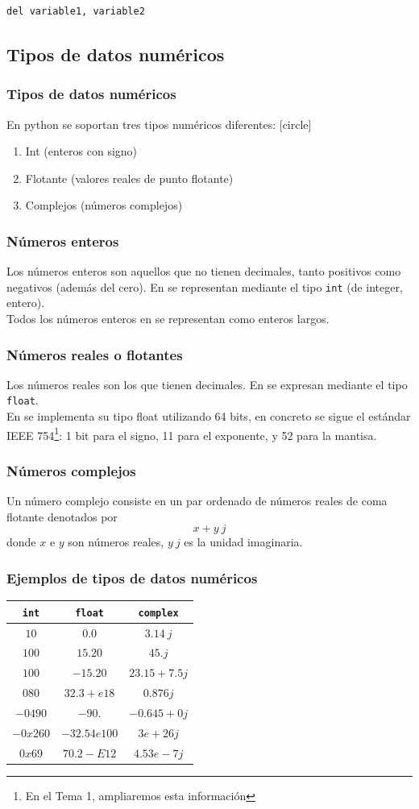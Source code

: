 {\begin{frame}[fragile]
\begin{verbatim}
del variable1, variable2
\end{verbatim}
\end{frame}
\subsection{Tipos de datos numéricos}
\begin{frame}
\frametitle{Tipos de datos numéricos}
En python se soportan tres tipos numéricos diferentes:
[circle]
\begin{enumerate}[<+->]
\item Int (enteros con signo)
\item Flotante (valores reales de punto flotante)
\item Complejos (números complejos)
\end{enumerate}
\end{frame}
\begin{frame}
\frametitle{Números enteros}
Los números enteros son aquellos que no tienen decimales, tanto positivos como negativos (además del cero). En \python{} se representan mediante el tipo \texttt{int} (de integer, entero).
\\
\bigskip
Todos los números enteros en  se representan como enteros largos.
\end{frame}
\begin{frame}
\frametitle{Números reales o flotantes}
Los números reales son los que tienen decimales. En \python{} se expresan mediante el tipo \texttt{float}.
\\
\bigskip
En \python{} se implementa su tipo float utilizando 64 bits, en concreto se sigue el estándar IEEE 754\footnote{En el Tema 1, ampliaremos esta información}: 1 bit para el signo, 11 para el exponente, y 52 para la mantisa.
\end{frame}
\begin{frame}
\frametitle{Números complejos}
Un número complejo consiste en un par ordenado de números reales de coma flotante denotados por
\[ x + y \: j\]
donde $x$ e $y$ son números reales, $y \: j$ es la unidad imaginaria.
\end{frame}
\begin{frame}
\frametitle{Ejemplos de tipos de datos numéricos}
\begin{table}
\begin{tabular}{| c | c | c |}
\hline
\texttt{int} & \texttt{float} & \texttt{complex} \\ \hline
$10$ & $0.0$ & $3.14 \: j$ \\ \hline
$100$ & $15.20$ & $45.j$ \\ \hline
$100$ & $-15.20$ & $23.15+7.5j$ \\ \hline
$080$ & $32.3+e18$ & $0.876j$ \\ \hline
$-0490$ & $-90.$ & $-0.645+0j$ \\ \hline
$-0x260$ & $-32.54e100$ & $3e+26j$ \\ \hline
$0x69$ & $70.2-E12$ & $4.53e-7j$ \\ \hline
\end{tabular}
\end{table}    
\end{frame}
}

